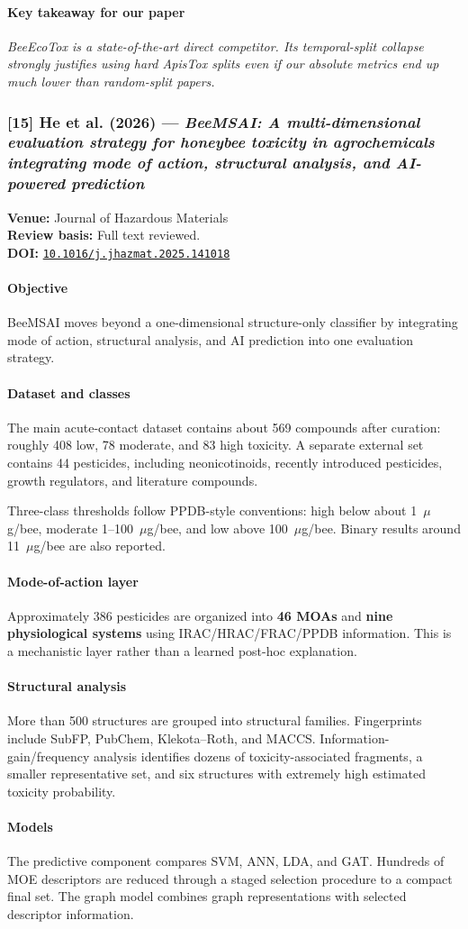 \documentclass[11pt]{article}
\newcommand{\reviewfield}[2]{\paragraph{#1}#2}
\newcommand{\keytakeaway}[1]{\paragraph{Key takeaway for our paper}\emph{#1}}
\newcommand{\paperdoi}[1]{\href{https://doi.org/#1}{\texttt{#1}}}
\begin{document}
\keytakeaway{BeeEcoTox is a state-of-the-art direct competitor. Its temporal-split collapse strongly justifies using hard ApisTox splits even if our absolute metrics end up much lower than random-split papers.}

\subsubsection{[15] He et al. (2026) --- \textit{BeeMSAI: A multi-dimensional evaluation strategy for honeybee toxicity in agrochemicals integrating mode of action, structural analysis, and AI-powered prediction}}
\textbf{Venue:} Journal of Hazardous Materials\\
\textbf{Review basis:} Full text reviewed.\\
\textbf{DOI:} \paperdoi{10.1016/j.jhazmat.2025.141018}

\reviewfield{Objective}{
BeeMSAI moves beyond a one-dimensional structure-only classifier by integrating mode of action, structural analysis, and AI prediction into one evaluation strategy.
}

\reviewfield{Dataset and classes}{
The main acute-contact dataset contains about 569 compounds after curation: roughly 408 low, 78 moderate, and 83 high toxicity. A separate external set contains 44 pesticides, including neonicotinoids, recently introduced pesticides, growth regulators, and literature compounds.

Three-class thresholds follow PPDB-style conventions: high below about 1~$\mu$g/bee, moderate 1--100~$\mu$g/bee, and low above 100~$\mu$g/bee. Binary results around 11~$\mu$g/bee are also reported.
}

\reviewfield{Mode-of-action layer}{
Approximately 386 pesticides are organized into \textbf{46 MOAs} and \textbf{nine physiological systems} using IRAC/HRAC/FRAC/PPDB information. This is a mechanistic layer rather than a learned post-hoc explanation.
}

\reviewfield{Structural analysis}{
More than 500 structures are grouped into structural families. Fingerprints include SubFP, PubChem, Klekota--Roth, and MACCS. Information-gain/frequency analysis identifies dozens of toxicity-associated fragments, a smaller representative set, and six structures with extremely high estimated toxicity probability.
}

\reviewfield{Models}{
The predictive component compares SVM, ANN, LDA, and GAT. Hundreds of MOE descriptors are reduced through a staged selection procedure to a compact final set. The graph model combines graph representations with selected descriptor information.
}
\end{document}
